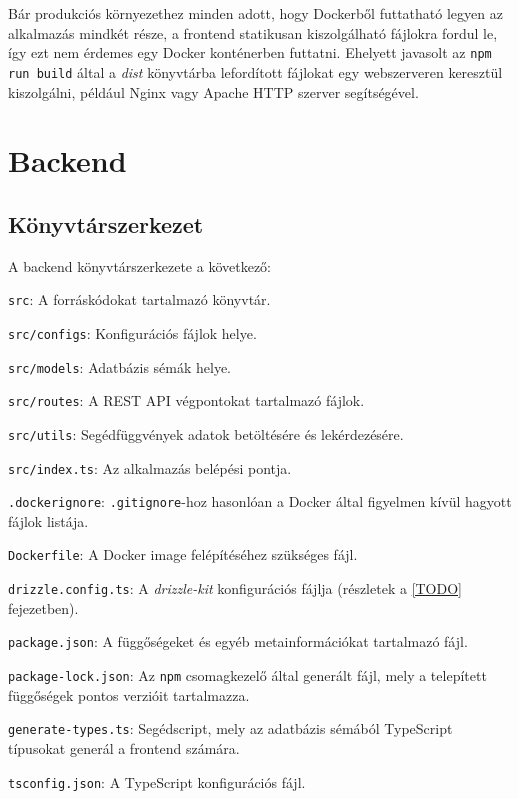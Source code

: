 Bár produkciós környezethez minden adott, hogy Dockerből futtatható legyen az alkalmazás mindkét része, a frontend statikusan kiszolgálható fájlokra fordul le, így ezt nem érdemes egy Docker konténerben futtatni. Ehelyett javasolt az \texttt{npm run build} által a \textit{dist} könyvtárba lefordított fájlokat egy webszerveren keresztül kiszolgálni, például Nginx vagy Apache HTTP szerver segítségével.

\section{Backend}

\subsection{Könyvtárszerkezet}

A backend könyvtárszerkezete a következő:

\begin{compactitem}
    \item \texttt{src}: A forráskódokat tartalmazó könyvtár.
    \item \texttt{src/configs}: Konfigurációs fájlok helye.
    \item \texttt{src/models}: Adatbázis sémák helye.
    \item \texttt{src/routes}: A REST API végpontokat tartalmazó fájlok.
    \item \texttt{src/utils}: Segédfüggvények adatok betöltésére és lekérdezésére.
    \item \texttt{src/index.ts}: Az alkalmazás belépési pontja.
    \item \texttt{.dockerignore}: \texttt{.gitignore}-hoz hasonlóan a Docker által figyelmen kívül hagyott fájlok listája.
    \item \texttt{Dockerfile}: A Docker image felépítéséhez szükséges fájl.
    \item \texttt{drizzle.config.ts}: A \textit{drizzle-kit} konfigurációs fájlja (részletek a \ref{TODO} fejezetben).
    \item \texttt{package.json}: A függőségeket és egyéb metainformációkat tartalmazó fájl.
    \item \texttt{package-lock.json}: Az \texttt{npm} csomagkezelő által generált fájl, mely a telepített függőségek pontos verzióit tartalmazza.
    \item \texttt{generate-types.ts}: Segédscript, mely az adatbázis sémából TypeScript típusokat generál a frontend számára.
    \item \texttt{tsconfig.json}: A TypeScript konfigurációs fájl.
\end{compactitem}

